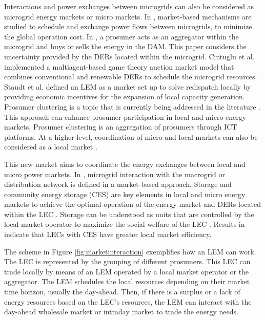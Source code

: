 Interactions and power exchanges between microgrids can also be considered as microgrid energy markets or micro markets. In \cite{Lee2015, Gregoratti2015}, market-based mechanisms are studied to schedule and exchange power flows between microgrids, to minimize the global operation cost. In \cite{ferruzzi2016optimal}, a prosumer acts as an aggregator within the microgrid and buys or sells the energy in the DAM. This paper considers the uncertainty provided by the DERs located within the microgrid. Cintuglu et al. \cite{cintuglu2015real} implemented a multiagent-based game theory auction market model that combines conventional and renewable DERs to schedule the microgrid resources. Staudt et al. \cite{staudt2017analysis} defined an LEM as a market set up to solve redispatch locally by providing economic incentives for the expansion of local capacity generation.
Prosumer clustering is a topic that is currently being addressed in the literature \cite{doulamis2017virtual, vergados2016prosumer, da2013impact}. This approach can enhance prosumer participation in local and micro energy markets. Prosumer clustering is an aggregation of prosumers through ICT platforms.
At a higher level, coordination of micro and local markets can also be considered as a local market \cite{menniti2014future}.

This new market aims to coordinate the energy exchanges between local and micro power markets. In \cite{zachar2016microgrid}, microgrid interaction with the macrogrid or distribution network is defined in a market-based approach. 
Storage and community energy storage (CES) are key elements in local and micro energy markets to achieve the optimal operation of the energy market and DERs located within the LEC \cite{Olivella2016ENERGYCON, Bayram2014, mengelkamp2017role, Menniti2015, menniti2014management, mediwaththe2017competitive}. Storage can be understood as units that are controlled by the local market operator to maximize the social welfare of the LEC \cite{Olivella2016ENERGYCON}. Results in \cite{mengelkamp2017role} indicate that LECs with CES have greater local market efficiency. 

The scheme in Figure \ref{fig:marketinteraction} exemplifies how an LEM can work. The LEC is represented by the grouping of different prosumers. This LEC can trade locally by means of an LEM operated by a local market operator or the aggregator. The LEM schedules the local resources depending on their market time horizon, usually the day-ahead. Then, if there is a surplus or a lack of energy resources based on the LEC's resources, the LEM can interact with the day-ahead wholesale market or intraday market to trade the energy needs.


